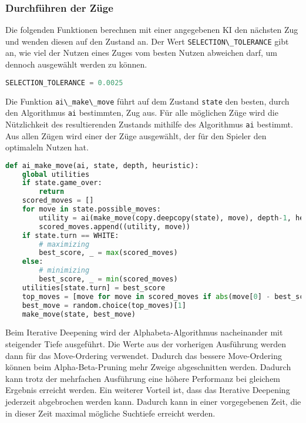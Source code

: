 \hypertarget{durchfuxfchren-der-zuxfcge}{%
\subsubsection{Durchführen der Züge}\label{durchfuxfchren-der-zuxfcge}}

Die folgenden Funktionen berechnen mit einer angegebenen KI den nächsten
Zug und wenden diesen auf den Zustand an. Der Wert
\passthrough{\lstinline!SELECTION\_TOLERANCE!} gibt an, wie viel der
Nutzen eines Zuges vom besten Nutzen abweichen darf, um dennoch
ausgewählt werden zu können.

\begin{lstlisting}[language=Python]
SELECTION_TOLERANCE = 0.0025
\end{lstlisting}

Die Funktion \passthrough{\lstinline!ai\_make\_move!} führt auf dem
Zustand \passthrough{\lstinline!state!} den besten, durch den
Algorithmus \passthrough{\lstinline!ai!} bestimmten, Zug aus. Für alle
möglichen Züge wird die Nützlichkeit des resultierenden Zustands
mithilfe des Algorithmus \passthrough{\lstinline!ai!} bestimmt. Aus
allen Zügen wird einer der Züge ausgewählt, der für den Spieler den
optimaleln Nutzen hat.

\begin{lstlisting}[language=Python]
def ai_make_move(ai, state, depth, heuristic):
    global utilities
    if state.game_over:
        return
    scored_moves = []
    for move in state.possible_moves:
        utility = ai(make_move(copy.deepcopy(state), move), depth-1, heuristic, -math.inf, math.inf)
        scored_moves.append((utility, move))
    if state.turn == WHITE:
        # maximizing
        best_score, _ = max(scored_moves)
    else:
        # minimizing
        best_score, _ = min(scored_moves)
    utilities[state.turn] = best_score
    top_moves = [move for move in scored_moves if abs(move[0] - best_score) <= SELECTION_TOLERANCE]
    best_move = random.choice(top_moves)[1]
    make_move(state, best_move)
\end{lstlisting}

Beim Iterative Deepening wird der Alphabeta-Algorithmus nacheinander mit
steigender Tiefe ausgeführt. Die Werte aus der vorherigen Ausführung
werden dann für das Move-Ordering verwendet. Dadurch das bessere
Move-Ordering können beim Alpha-Beta-Pruning mehr Zweige abgeschnitten
werden. Dadurch kann trotz der mehrfachen Ausführung eine höhere
Performanz bei gleichem Ergebnis erreicht werden. Ein weiterer Vorteil
ist, dass das Iterative Deepening jederzeit abgebrochen werden kann.
Dadurch kann in einer vorgegebenen Zeit, die in dieser Zeit maximal
mögliche Suchtiefe erreicht werden.

